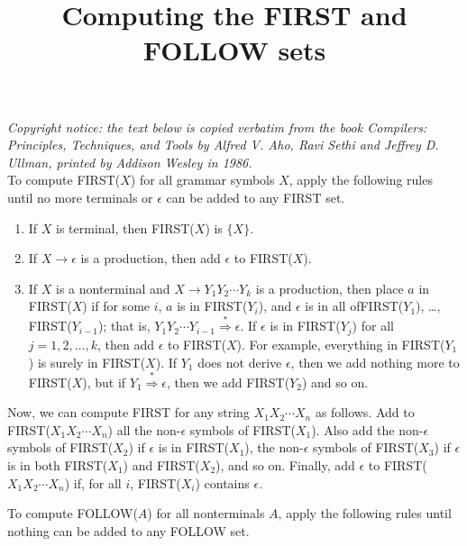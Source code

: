 \documentclass[oneside]{article}
\title{Computing the FIRST and FOLLOW sets}
\begin{document}

\textit{Copyright notice: the text below is copied verbatim from the book
\emph{Compilers: Principles, Techniques, and Tools} by \emph{Alfred V. Aho},
\emph{Ravi Sethi} and \emph{Jeffrey D. Ullman}, printed by \emph{Addison Wesley}
in \emph{1986}.}\\

To compute FIRST($X$) for all grammar symbols $X$, apply the following
rules until no more terminals or $\epsilon$ can be added to any FIRST
set.

\begin{enumerate}

\item{If $X$ is terminal, then FIRST($X$) is $\{X\}$.}

\item{If $X\rightarrow\epsilon$ is a production, then add $\epsilon$ to
FIRST($X$).}

\item{If $X$ is a nonterminal and $X\rightarrow Y_1 Y_2\cdots Y_k$ is a
production, then place $a$ in FIRST($X$) if for some $i$, $a$ is in FIRST($Y_i$),
and $\epsilon$ is in all of\linebreak FIRST($Y_1$), \dots, FIRST($Y_{i-1}$); that
is, $Y_1 Y_2\cdots Y_{i-1}\stackrel{*}\Rightarrow\epsilon$. If $\epsilon$ is
in FIRST($Y_j$) for all $j=1,2,\dots,k$, then add $\epsilon$ to FIRST($X$). For
example, everything in FIRST($Y_1$) is surely in FIRST($X$). If $Y_1$ does not
derive $\epsilon$, then we add nothing more to FIRST($X$), but if $Y_1
\stackrel{*}\Rightarrow\epsilon$, then we add FIRST($Y_2$) and so on.}

\end{enumerate}

Now, we can compute FIRST for any string $X_1 X_2\cdots X_n$ as follows. Add to
FIRST($X_1 X_2\cdots X_n$) all the non-$\epsilon$ symbols of FIRST($X_1$). Also
add the non-$\epsilon$ symbols of FIRST($X_2$) if $\epsilon$ is in FIRST($X_1$),
the non-$\epsilon$ symbols of FIRST($X_3$) if $\epsilon$ is in both FIRST($X_1$)
and FIRST($X_2$), and so on. Finally, add $\epsilon$ to FIRST($X_1 X_2\cdots X_n$)
if, for all $i$, FIRST($X_i$) contains $\epsilon$.

To compute FOLLOW($A$) for all nonterminals $A$, apply the following rules
until nothing can be added to any FOLLOW set.
\end{document}
